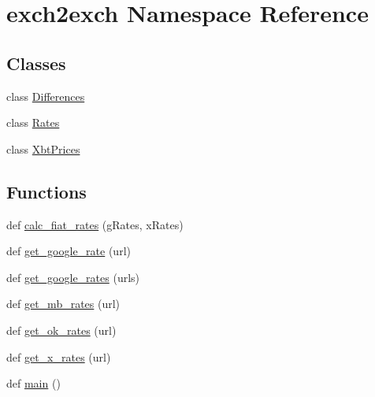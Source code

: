 \hypertarget{namespaceexch2exch}{}\section{exch2exch Namespace Reference}
\label{namespaceexch2exch}
\subsection*{Classes}
\begin{DoxyCompactItemize}
\item 
class \hyperlink{classexch2exch_1_1_differences}{Differences}
\item 
class \hyperlink{classexch2exch_1_1_rates}{Rates}
\item 
class \hyperlink{classexch2exch_1_1_xbt_prices}{Xbt\+Prices}
\end{DoxyCompactItemize}
\subsection*{Functions}
\begin{DoxyCompactItemize}
\item 
def \hyperlink{namespaceexch2exch_a2f3337121882596d0644f2d48ffb870c}{calc\+\_\+fiat\+\_\+rates} (g\+Rates, x\+Rates)
\item 
def \hyperlink{namespaceexch2exch_a20ad08d045d52bdcb3977eaa8f951622}{get\+\_\+google\+\_\+rate} (url)
\item 
def \hyperlink{namespaceexch2exch_ae0891a93a4a9cfe932011afddd41808d}{get\+\_\+google\+\_\+rates} (urls)
\item 
def \hyperlink{namespaceexch2exch_a4226f3cef9fff15993d8b230a5cb92e4}{get\+\_\+mb\+\_\+rates} (url)
\item 
def \hyperlink{namespaceexch2exch_a157dc1519ab4a24783fab8bf7db9c17e}{get\+\_\+ok\+\_\+rates} (url)
\item 
def \hyperlink{namespaceexch2exch_a928a1249a810cfd0ec5fca3ec8f764fb}{get\+\_\+x\+\_\+rates} (url)
\item 
def \hyperlink{namespaceexch2exch_a4a7d6bc2c47add0970ca3e0c28a5cb63}{main} ()
\end{DoxyCompactItemize}
